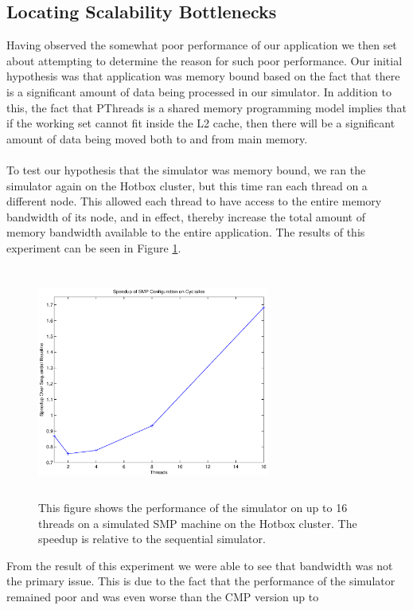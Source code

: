 \documentclass[twocolumn]{article}
\begin{document}
\subsection{Locating Scalability Bottlenecks}
Having observed the somewhat poor performance of our application we then
set about attempting to determine the reason for such poor performance.
Our initial hypothesis was that application was memory bound based on the
fact that there is a significant amount of data being processed in our
simulator.  In addition to this, the fact that PThreads is a shared memory
programming model implies that if the working set cannot fit inside the L2
cache, then there will be a significant amount of data being moved both to
and from main memory.\\
~\\
To test our hypothesis that the simulator was memory bound, we ran the
simulator again on the Hotbox cluster, but this time ran each thread on a
different node.  This allowed each thread to have access to the entire
memory bandwidth of its node, and in effect, thereby increase the total
amount of memory bandwidth available to the entire application.  The
results of this experiment can be seen in Figure \ref{smp}.\\
\begin{figure}[h]
\centering
\includegraphics[height=3in,width=3in]{smp.eps}
\caption{\label{smp}This figure shows the performance of the simulator on
up to 16 threads on a simulated SMP machine on the Hotbox cluster.  The speedup is relative to
the sequential simulator.}
\end{figure}
From the result of this experiment we were able to see that bandwidth was
not the primary issue.  This is due to the fact that the performance of
the simulator remained poor and was even worse than the CMP version up to
\end{document}
